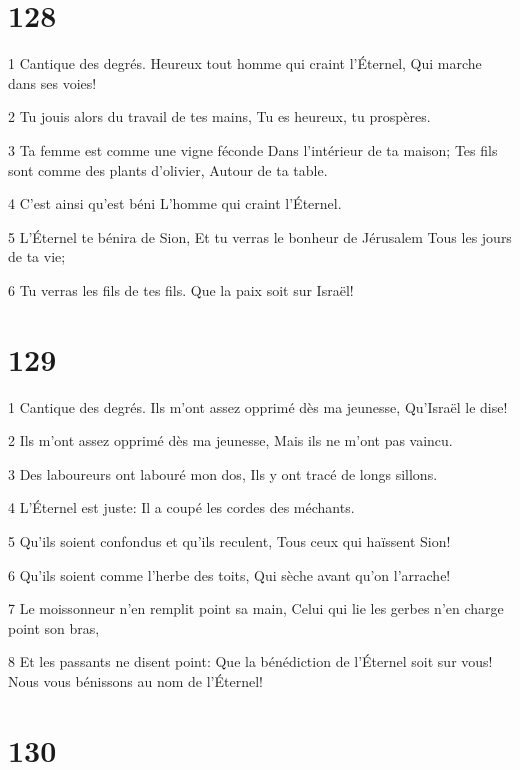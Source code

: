 \chapter{128}

\par 1 Cantique des degrés. Heureux tout homme qui craint l'Éternel, Qui marche dans ses voies!
\par 2 Tu jouis alors du travail de tes mains, Tu es heureux, tu prospères.
\par 3 Ta femme est comme une vigne féconde Dans l'intérieur de ta maison; Tes fils sont comme des plants d'olivier, Autour de ta table.
\par 4 C'est ainsi qu'est béni L'homme qui craint l'Éternel.
\par 5 L'Éternel te bénira de Sion, Et tu verras le bonheur de Jérusalem Tous les jours de ta vie;
\par 6 Tu verras les fils de tes fils. Que la paix soit sur Israël!

\chapter{129}

\par 1 Cantique des degrés. Ils m'ont assez opprimé dès ma jeunesse, Qu'Israël le dise!
\par 2 Ils m'ont assez opprimé dès ma jeunesse, Mais ils ne m'ont pas vaincu.
\par 3 Des laboureurs ont labouré mon dos, Ils y ont tracé de longs sillons.
\par 4 L'Éternel est juste: Il a coupé les cordes des méchants.
\par 5 Qu'ils soient confondus et qu'ils reculent, Tous ceux qui haïssent Sion!
\par 6 Qu'ils soient comme l'herbe des toits, Qui sèche avant qu'on l'arrache!
\par 7 Le moissonneur n'en remplit point sa main, Celui qui lie les gerbes n'en charge point son bras,
\par 8 Et les passants ne disent point: Que la bénédiction de l'Éternel soit sur vous! Nous vous bénissons au nom de l'Éternel!

\chapter{130}

